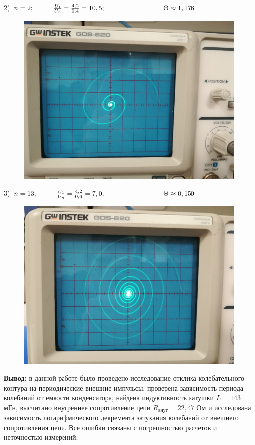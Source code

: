 \documentclass[a4paper,12pt]{article} %
\begin{document}
\newpage

2) $n = 2; \hspace{10mm} \frac{U_1}{U_n} = \frac{4,2}{0,4} = 10,5; \hspace{30mm} \Theta \approx 1,176$

\begin{figure}[h!]
	\centering
	\includegraphics[scale=0.22]{2.jpg}
\end{figure}

\vspace{15mm}

3) $n = 13; \hspace{10mm} \frac{U_1}{U_n} = \frac{4,2}{0,6} = 7,0; \hspace{30mm} \Theta \approx 0,150$

\begin{figure}[h!]
	\centering
	\includegraphics[scale=0.22]{3.jpg}
\end{figure}

\newpage

\textbf{Вывод:} в данной работе было проведено исследование отклика колебательного контура на периодические внешние импульсы, проверена зависимость периода колебаний от емкости конденсатора, найдена индуктивность катушки $L = 143$ мГн, высчитано внутреннее сопротивление цепи $R_{\text{внут}} = 22,47$ Ом и исследована зависимость логарифмического декремента затухания колебаний от внешнего сопротивления цепи. Все ошибки связаны с погрешностью расчетов и неточностью измерений. 
\end{document}
